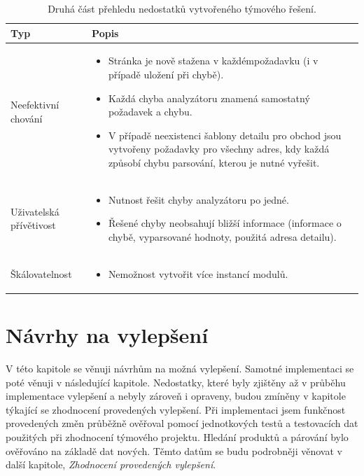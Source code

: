 \documentclass[thesis=B,czech]{FITthesis}[2012/06/26]
\begin{document}
\begin{table}[h]\centering
    \begin{tabular}{ | l | p{7cm} |}  
    \hline
    Typ & Popis \\ \hline
	Neefektivní chování & 
		\begin{itemize}
  			\item Stránka je nově stažena  v každémpožadavku (i v případě uložení při chybě).
  			\item Každá chyba analyzátoru znamená samostatný požadavek a chybu.
  			\item V případě neexistenci šablony detailu pro obchod jsou vytvořeny požadavky pro všechny adres, kdy každá způsobí chybu parsování, kterou je nutné vyřešit.
  		\end{itemize} \\ \hline	
	\hline
	Uživatelská přívětivost & 
		\begin{itemize}
  			\item Nutnost řešit chyby analyzátoru po jedné.
  			\item Řešené chyby neobsahují bližší informace (informace o chybě, vyparsované hodnoty, použitá adresa detailu).
  		\end{itemize} \\ \hline	
	\hline
	Škálovatelnost & 
		\begin{itemize}
  			\item Nemožnost vytvořit více instancí modulů.
  		\end{itemize} \\ \hline
    \end{tabular}
	\caption{Druhá část přehledu nedostatků vytvořeného týmového řešení.}
	\label{table:analysis-old2}
\end{table}


\chapter{Návrhy na vylepšení}
V této kapitole se věnuji návrhům na možná vylepšení. Samotné implementaci se poté věnuji v následující kapitole. 
Nedostatky, které byly zjištěny až v průběhu implementace vylepšení a nebyly zároveň i opraveny, budou zmíněny v kapitole týkající se zhodnocení
provedených vylepšení. Při implementaci jsem funkčnost provedených změn průběžně ověřoval pomocí jednotkových testů a testovacích dat použitých při zhodnocení týmového projektu. Hledání produktů a párování bylo ověřováno na základě dat nových. Těmto datům se budu podrobněji věnovat v další kapitole, \textit{Zhodnocení provedených vylepšení}.
\par
\end{document}
